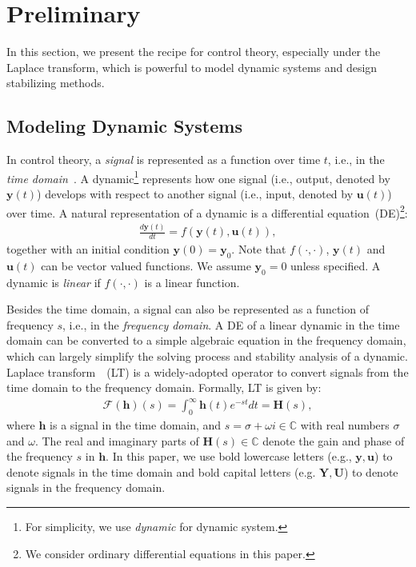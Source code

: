 \documentclass{article}
\newcommand{\F}{\mathcal{F}}
\newcommand{\ty}{\bm{y}}
\newcommand{\tu}{\bm{u}}
\newcommand{\tth}{\bm{h}}
\newcommand{\fY}{\bm{Y}}
\newcommand{\fU}{\bm{U}}
\newcommand{\fH}{\bm{H}}
\newcommand{\Complex}{\mathbb{C}}
\theoremstyle{definition}
\begin{document}
\section{Preliminary}
\label{sec:preliminary}


In this section, we present the recipe for control theory, especially under the Laplace transform, which is powerful to model dynamic systems and design stabilizing methods.

\subsection{Modeling Dynamic Systems }
\label{sec:dynamicmodeling}


In control theory, a {\it signal} is represented as a function over time $t$, i.e., in the {\it time domain}~\cite{kailath1980linear}. 
A dynamic\footnote{For simplicity, we use {\it dynamic} for dynamic system.} represents how one signal (i.e., output, denoted by $\ty(t)$) develops with respect to another signal (i.e., input, denoted by $\tu(t)$) over time. A natural representation of a dynamic is a differential equation~(DE)\footnote{We consider ordinary differential equations in this paper.}:
\begin{align}
\frac{d\ty(t)}{dt} = f(\ty(t), \tu(t)),
\label{eqn:general_dynamic}
\end{align}
together with an initial condition $\ty(0) = \ty_0$.
Note that $f(\cdot, \cdot)$, $\ty(t)$ and $\tu(t)$ can be vector valued functions. 
We assume $\ty_0 = 0$ unless specified.
A dynamic is {\it linear} if $f(\cdot, \cdot)$ is a linear function.




Besides the time domain, a signal can also be represented as a function of frequency $s$, i.e., in the {\it frequency domain}.
A DE of a linear dynamic in the time domain can be converted to a simple algebraic equation in the frequency domain, which can largely simplify the solving process and stability analysis of a dynamic. Laplace transform~\cite{widder2015laplace}~(LT) is a widely-adopted operator to convert signals from the time domain to the frequency domain. Formally, LT is given by:
\begin{align}
\F(\tth)(s)=\int_{0}^{\infty} \tth(t) e^{-st} dt = \fH(s), \label{eqn:lap_definition}
\end{align}
where $\tth$ is a signal in the time domain, and $s=\sigma + \omega i\in \Complex$ with real numbers $\sigma$ and $\omega$. The real and imaginary parts of $\fH(s)\in\Complex$ denote the gain and phase of the frequency $s$ in $\tth$. In this paper, we use bold lowercase letters (e.g., $\ty, \tu$) to denote signals in the time domain and bold capital letters (e.g. $\fY, \fU$) to denote signals in the frequency domain.
\end{document}
